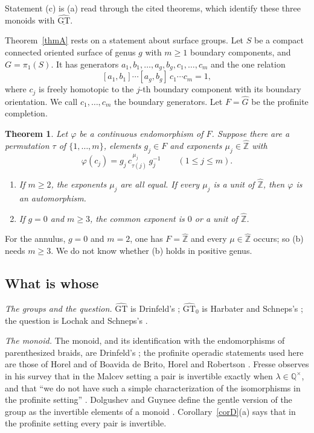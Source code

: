 \documentclass[11pt]{amsart}
\newtheorem{theorem}{Theorem}
\theoremstyle{definition}
\theoremstyle{remark}
\newcommand{\Q}{\mathbb Q}
\newcommand{\Zh}{\widehat{\mathbb Z}}
\newcommand{\GT}{\widehat{\mathrm{GT}}}
\newcommand{\GTz}{\widehat{\mathrm{GT}}_0}
\newcommand{\GTm}{\underline{\widehat{\mathrm{GT}}}}
\newcommand{\ph}{\varphi}
\begin{document}
Statement (c) is (a) read through the cited theorems, which identify these three monoids with $\GTm$.

Theorem~\ref{thmA} rests on a statement about surface groups. Let $S$ be a compact connected oriented surface of genus $g$ with $m\ge1$ boundary components, and $G=\pi_1(S)$. It has generators $a_1,b_1,\dots,a_g,b_g,c_1,\dots,c_m$ and the one relation
\begin{equation}\label{eq:surface}
 [a_1,b_1]\cdots[a_g,b_g]\,c_1\cdots c_m=1,
\end{equation}
where $c_j$ is freely homotopic to the $j$-th boundary component with its boundary orientation. We call $c_1,\dots,c_m$ the boundary generators. Let $F=\widehat G$ be the profinite completion.

\begin{theorem}\label{thmE}
Let $\ph$ be a continuous endomorphism of $F$. Suppose there are a permutation $\tau$ of $\{1,\dots,m\}$, elements $g_j\in F$ and exponents $\mu_j\in\Zh$ with
\[
 \ph(c_j)=g_j\,c_{\tau(j)}^{\,\mu_j}\,g_j^{-1}\qquad(1\le j\le m).
\]
\begin{enumerate}
\item[(a)] If $m\ge2$, the exponents $\mu_j$ are all equal. If every $\mu_j$ is a unit of $\Zh$, then $\ph$ is an automorphism.
\item[(b)] If $g=0$ and $m\ge3$, the common exponent is $0$ or a unit of $\Zh$.
\end{enumerate}
\end{theorem}

For the annulus, $g=0$ and $m=2$, one has $F=\Zh$ and every $\mu\in\Zh$ occurs; so (b) needs $m\ge3$. We do not know whether (b) holds in positive genus.

\subsection{What is whose}
\emph{The groups and the question.} $\GT$ is Drinfeld's \cite{D}; $\GTz$ is Harbater and Schneps's \cite{HS}; the question is Lochak and Schneps's \cite{LS}.

\emph{The monoid.} The monoid, and its identification with the endomorphisms of parenthesized braids, are Drinfeld's \cite[\S4]{D}; the profinite operadic statements used here are those of Horel \cite{Hor} and of Boavida de Brito, Horel and Robertson \cite{BHR}. Fresse observes in his survey that in the Malcev setting a pair is invertible exactly when $\lambda\in\Q^\times$, and that ``we do not have such a simple characterization of the isomorphisms in the profinite setting'' \cite[\S2.6]{F}. Dolgushev and Guynee define the gentle version of the group as the invertible elements of a monoid \cite[Definition~2.5]{DG}. Corollary~\ref{corD}(a) says that in the profinite setting every pair is invertible.
\end{document}
